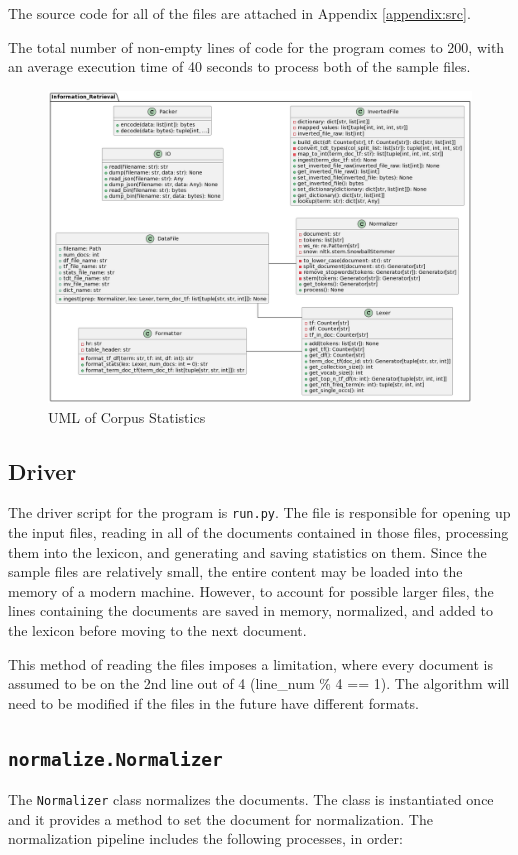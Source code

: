 \documentclass[11pt]{article}
\begin{document}
The source code for all of the files are attached in Appendix \ref{appendix:src}.

The total number of non-empty lines of code for the program comes to 200, with an average execution time of 40 seconds to process both of the sample files.

\begin{figure}[!ht]
    \caption{UML of Corpus Statistics}
    \centering
    \includegraphics[scale=0.6]{statics/uml.png}
\end{figure}

\subsection{Driver} \label{sec:driver}
The driver script for the program is \texttt{run.py}. The file is responsible for opening up the input files, reading in all of the documents contained in those files, processing them into the lexicon, and generating and saving statistics on them. Since the sample files are relatively small, the entire content may be loaded into the memory of a modern machine. However, to account for possible larger files, the lines containing the documents are saved in memory, normalized, and added to the lexicon before moving to the next document.

This method of reading the files imposes a limitation, where every document is assumed to be on the 2nd line out of 4 (line\_num \% 4 == 1). The algorithm will need to be modified if the files in the future have different formats.

\subsection{\texttt{normalize.Normalizer}}
The \texttt{Normalizer} class normalizes the documents. The class is instantiated once and it provides a method to set the document for normalization. The normalization pipeline includes the following processes, in order:
\end{document}
